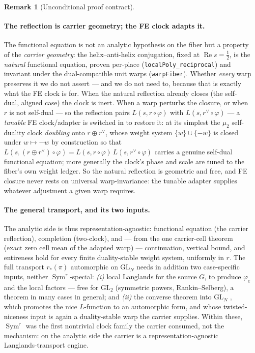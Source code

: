 \documentclass[11pt]{article}
\theoremstyle{definition}
\newtheorem{remark}[theorem]{Remark}
\renewcommand{\Re}{\operatorname{Re}}
\newcommand{\Sym}{\operatorname{Sym}}
\begin{document}
\begin{remark}[Unconditional proof contract]
\begin{enumerate}
\paragraph{The reflection is carrier geometry; the FE clock adapts it.} The functional equation is not an
analytic hypothesis on the fiber but a property of the \emph{carrier geometry}: the helix--anti-helix
conjugation, fixed at $\Re s=\tfrac12$, is the \emph{natural} functional equation, proven per-place
(\texttt{localPoly\_reciprocal}) and invariant under the dual-compatible unit warps (\texttt{warpFiber}).
Whether \emph{every} warp preserves it we do not assert --- and we do not need to, because that is exactly
what the FE clock is for. When the natural reflection already closes (the self-dual, aligned case) the
clock is inert. When a warp perturbs the closure, or when $r$ is not self-dual --- so the reflection pairs
$L(s,r\circ\varphi)$ with $L(s,r^\vee\circ\varphi)$ --- a \emph{tunable} FE clock/adapter is switched in to
restore it: at its simplest the $\mu_2$ self-duality clock \emph{doubling} onto $r\oplus r^\vee$, whose
weight system $\{w\}\cup\{-w\}$ is closed under $w\mapsto-w$ by construction so that
$L(s,(r\oplus r^\vee)\circ\varphi)=L(s,r\circ\varphi)\,L(s,r^\vee\circ\varphi)$ carries a genuine self-dual
functional equation; more generally the clock's phase and scale are tuned to the fiber's own weight ledger.
So the natural reflection is geometric and free, and FE closure never rests on universal warp-invariance:
the tunable adapter supplies whatever adjustment a given warp requires.

\paragraph{The general transport, and its two inputs.} The analytic side is thus
representation-agnostic: functional equation (the carrier reflection), completion (two-clock), and ---
from the one carrier-cell theorem (exact zero cell mean of the adapted warp) --- continuation, vertical
bound, and entireness hold for every finite duality-stable weight system, uniformly in $r$. The full transport $r_*(\pi)$ automorphic on
$\mathrm{GL}_N$ needs in addition two case-specific inputs, neither $\Sym^r$-special: \emph{(i)} local
Langlands for the source $G$, to produce $\varphi_v$ and the local factors --- free for $\mathrm{GL}_2$
(symmetric powers, Rankin--Selberg), a theorem in many cases in general; and \emph{(ii)} the converse
theorem into $\mathrm{GL}_N$ \cite{CPS}, which promotes the nice $L$-function to an automorphic form, and
whose twisted-niceness input is again a duality-stable warp the carrier supplies. Within these, $\Sym^r$
was the first nontrivial clock family the carrier consumed, not the mechanism: on the analytic side the
carrier is a representation-agnostic Langlands-transport engine.


\end{enumerate}
\end{remark}
\end{document}
